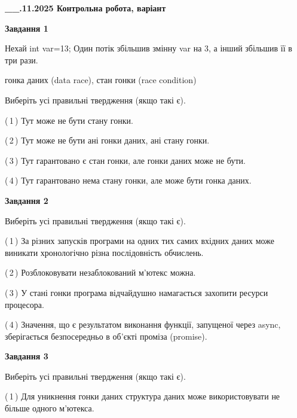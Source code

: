 \documentclass[12pt, ukrainian]{article}
\begin{document}
\begin {large}

\textbf{\_\_.11.2025 Контрольна робота, варіант  }\par


{

\begin{center}
\textbf{Завдання 1}
\end{center}
Нехай int var=13; Один потік збільшив змінну var на 3, а інший збільшив її в три рази.

гонка даних (data race), стан гонки (race condition)

Виберіть усі правильні твердження (якщо такі є).\par
\vspace{2mm}
(\,1\,) Тут може не бути стану гонки.%

(\,2\,) Тут може не бути ані гонки даних, ані стану гонки.%

(\,3\,) Тут гарантовано є стан гонки, але гонки даних може не бути.%

(\,4\,) Тут гарантовано нема стану гонки, але може бути гонка даних.%



\begin{center}
\textbf{Завдання 2}
\end{center}
Виберіть усі правильні твердження (якщо такі є).\par
\vspace{2mm}

(\,1\,) За різних запусків програми на одних тих самих вхідних даних може виникати хронологічно різна послідовність обчислень.%

(\,2\,) Розблоковувати незаблокований м’ютекс можна.%

(\,3\,) У стані гонки програма відчайдушно намагається захопити ресурси процесора.%

(\,4\,) Значення, що є результатом виконання функції, запущеної через async, зберігається безпосередньо в об’єкті проміза (promise).%



\begin{center}
\textbf{Завдання 3}
\end{center}
Виберіть усі правильні твердження (якщо такі є).\par
\vspace{2mm}

(\,1\,) Для уникнення гонки даних структура даних може використовувати не більше одного м’ютекса.%

}
\end{large}
\end{document}
